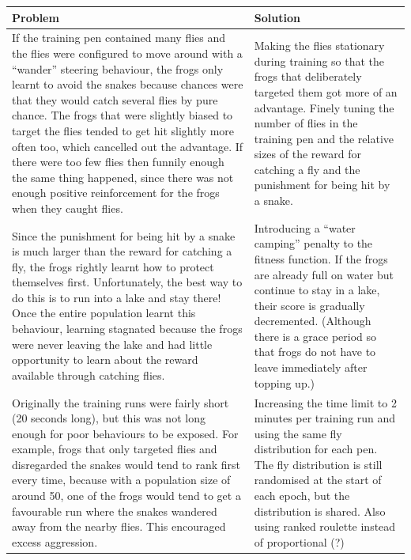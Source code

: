 \hspace*{-0.27in}
\begin{tabular}
{|p{11cm}|p{6.5cm}|}
\hline
\textbf{Problem} & \textbf{Solution}\\
\hline
If the training pen contained many flies and the flies were configured to move around with a ``wander'' steering behaviour, the frogs only learnt to avoid the snakes because chances were that they would catch several flies by pure chance. The frogs that were slightly biased to target the flies tended to get hit slightly more often too, which cancelled out the advantage. If there were too few flies then funnily enough the same thing happened, since there was not enough positive reinforcement for the frogs when they caught flies. & Making the flies stationary during training so that the frogs that deliberately targeted them got more of an advantage. Finely tuning the number of flies in the training pen and the relative sizes of the reward for catching a fly and the punishment for being hit by a snake.\\
\hline
Since the punishment for being hit by a snake is much larger than the reward for catching a fly, the frogs rightly learnt how to protect themselves first. Unfortunately, the best way to do this is to run into a lake and stay there! Once the entire population learnt this behaviour, learning stagnated because the frogs were never leaving the lake and had little opportunity to learn about the reward available through catching flies. & Introducing a ``water camping'' penalty to the fitness function. If the frogs are already full on water but continue to stay in a lake, their score is gradually decremented. (Although there is a grace period so that frogs do not have to leave immediately after topping up.)\\
\hline
Originally the training runs were fairly short (20 seconds long), but this was not long enough for poor behaviours to be exposed. For example, frogs that only targeted flies and disregarded the snakes would tend to rank first every time, because with a population size of around 50, one of the frogs would tend to get a favourable run where the snakes wandered away from the nearby flies. This encouraged excess aggression. & Increasing the time limit to 2 minutes per training run and using the same fly distribution for each pen. The fly distribution is still randomised at the start of each epoch, but the distribution is shared. Also using ranked roulette instead of proportional (?)\\
\hline
\end{tabular}


